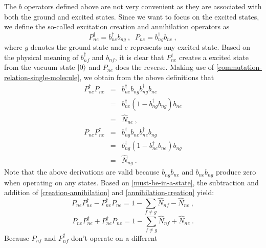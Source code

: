 The $b$ operators defined above are not very convenient as they are associated with both the ground and excited states. Since 
we want to focus on the excited states, we define the so-called excitation creation and annihilation operators
as  
\begin{equation}
P_{ne}^{\dagger} = b_{ne}^{\dagger} b_{ng} \ , \;\;P_{ne}=b_{ng}^{\dagger} b_{ne} \ , \label{creation&annihilation}
\end{equation}
where $g$ denotes the ground state and $e$ represents any excited state. 
Based on the physical meaning of $b_{nf}^{\dagger}$ and $b_{nf}$, it is clear that $P_{ne}^{\dagger}$ creates a 
excited state from the vacuum state $| 0 \rangle$ and $P_{ne}$ does the reverse.
Making use of \autoref{commutation-relation-single-molecule}, we obtain from the above definitions that
\begin{eqnarray}
P_{ne}^{\dagger} P_{ne} &=& b_{ne}^{\dagger} b_{ng}b_{ng}^{\dagger} b_{ne} \nonumber \\
                                      &=& b_{ne}^{\dagger}(1-b_{ng}^{\dagger}b_{ng})b_{ne} \nonumber \\
                                      &=& \hat{N}_{ne} \ , \label{creation-annihilation}
\end{eqnarray}
\begin{eqnarray}
P_{ne} P_{ne}^{\dagger} &=& b_{ng}^{\dagger} b_{ne} b_{ne}^{\dagger} b_{ng} \nonumber \\
                                      &=& b_{ng}^{\dagger}(1-b_{ne}^{\dagger}b_{ne})b_{ng} \nonumber \\
                                      &=& \hat{N}_{ng} \ . \label{annihilation-creation}
\end{eqnarray}
Note that the above derivations are valid because $b_{ng} b_{ne}$ and $b_{ne} b_{ng}$ produce zero when operating on any states. 
Based on \autoref{must-be-in-a-state}, the subtraction and addition of \autoref{creation-annihilation} and \autoref{annihilation-creation} yield:
\begin{equation}
P_{ne} P_{ne}^{\dagger} - P_{ne}^{\dagger} P_{ne} = 1 - \sum_{f\neq g} \hat{N}_{nf}  -\hat{N}_{ne}\ , \label{exact-relation}
\end{equation}
\begin{equation}
P_{ne} P_{ne}^{\dagger} + P_{ne}^{\dagger} P_{ne} = 1  - \sum_{f\neq g} \hat{N}_{nf}  + \hat{N}_{ne} \ . \label{eqn:addition}
\end{equation}
Because $P_{nf}$ and $P_{nf}^{\dagger}$ don't operate on a different
